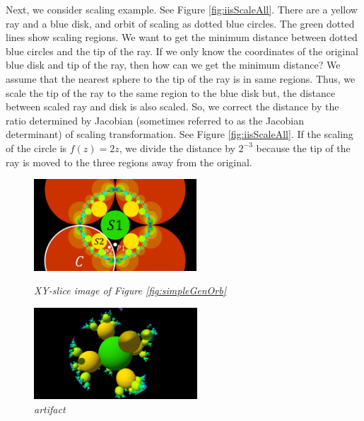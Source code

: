 Next, we consider scaling example.
See Figure \ref{fig:iisScaleAll}.
There are a yellow ray and a blue disk, and orbit of scaling as
dotted blue circles.
The green dotted lines show scaling regions.
We want to get the minimum distance between dotted blue circles and the
tip of the ray.
If we only know the coordinates of the original blue
disk and tip of the ray, then how can we get the minimum distance?
We assume that the nearest sphere to the tip of the ray is in
same regions. 
Thus, we scale the tip of the ray to the same region to the blue disk
but, the distance between scaled ray and disk is also scaled.
So, we correct the distance by the ratio determined by Jacobian
(sometimes referred to as the Jacobian determinant) of scaling transformation.
See Figure \ref{fig:iisScaleAll}.
If the scaling of the circle is $f(z) = 2z$, we divide the distance by
$2^{-3}$ because the tip of the ray is moved to the three regions away
from the original.

\begin{figure}[htbp]
 \begin{minipage}[t]{0.5\hsize}
  \center
  \includegraphics[height=1.35in, keepaspectratio]{img/preparation/slice.png}
  \caption{\textit{XY-slice image of Figure \ref{fig:simpleGenOrb}}}
  \label{fig:slice2d}
  \hspace*{\fill}
 \end{minipage}
 \begin{minipage}[t]{0.5\hsize}
  \center
  \includegraphics[height=1.35in, keepaspectratio]{img/preparation/artifact.pdf}
  \caption{\textit{artifact}}
  \label{fig:3dartifact}
  \hspace*{\fill}
 \end{minipage}
\end{figure}

